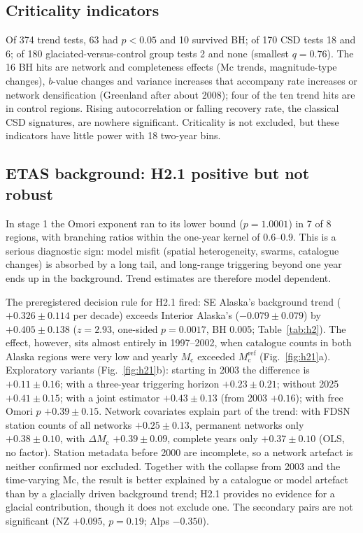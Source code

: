 \documentclass[11pt,a4paper]{article}
\newcommand{\Mc}{M_\mathrm{c}}
\begin{document}
\subsection{Criticality indicators}
\label{sec:crit}
Of 374 trend tests, 63 had $p<0.05$ and 10 survived BH; of 170 CSD tests 18 and 6; of 180 glaciated-versus-control group tests 2 and none (smallest $q=0.76$). The 16 BH hits are network and completeness effects (Mc trends, magnitude-type changes), $b$-value changes and variance increases that accompany rate increases or network densification (Greenland after about 2008); four of the ten trend hits are in control regions. Rising autocorrelation or falling recovery rate, the classical CSD signatures, are nowhere significant. Criticality is not excluded, but these indicators have little power with 18 two-year bins.

\subsection{ETAS background: H2.1 positive but not robust}
In stage 1 the Omori exponent ran to its lower bound ($p=1.0001$) in 7 of 8 regions, with branching ratios within the one-year kernel of 0.6--0.9. This is a serious diagnostic sign: model misfit (spatial heterogeneity, swarms, catalogue changes) is absorbed by a long tail, and long-range triggering beyond one year ends up in the background. Trend estimates are therefore model dependent.

The preregistered decision rule for H2.1 fired: SE Alaska's background trend ($+0.326\pm0.114$ per decade) exceeds Interior Alaska's ($-0.079\pm0.079$) by $+0.405\pm0.138$ ($z=2.93$, one-sided $p=0.0017$, BH 0.005; Table~\ref{tab:h2}). The effect, however, sits almost entirely in 1997--2002, when catalogue counts in both Alaska regions were very low and yearly $\Mc$ exceeded $\Mc^\mathrm{ref}$ (Fig.~\ref{fig:h21}a). Exploratory variants (Fig.~\ref{fig:h21}b): starting in 2003 the difference is $+0.11\pm0.16$; with a three-year triggering horizon $+0.23\pm0.21$; without 2025 $+0.41\pm0.15$; with a joint estimator $+0.43\pm0.13$ (from 2003 $+0.16$); with free Omori $p$ $+0.39\pm0.15$. Network covariates explain part of the trend: with FDSN station counts of all networks $+0.25\pm0.13$, permanent networks only $+0.38\pm0.10$, with $\Delta\Mc$ $+0.39\pm0.09$, complete years only $+0.37\pm0.10$ (OLS, no factor). Station metadata before 2000 are incomplete, so a network artefact is neither confirmed nor excluded. Together with the collapse from 2003 and the time-varying Mc, the result is better explained by a catalogue or model artefact than by a glacially driven background trend; H2.1 provides no evidence for a glacial contribution, though it does not exclude one. The secondary pairs are not significant (NZ $+0.095$, $p=0.19$; Alps $-0.350$).
\end{document}
